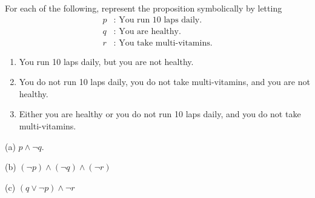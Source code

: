 \documentclass[a4paper,12pt]{article}
\begin{document}
\begin{problem}
	For each of the following, represent the proposition symbolically by letting
	\begin{align*}
	p &: \textrm{ You run 10 laps daily.} \\
	q &: \textrm{ You are healthy.} \\
	r &: \textrm{ You take multi-vitamins.}
	\end{align*}
	\begin{enumerate}[label= (\alph*)]
		\item You run 10 laps daily, but you are not healthy. 
		\item You do not run 10 laps daily, you do not take multi-vitamins, and you are not healthy. 
		\item Either you are healthy or you do not run 10 laps daily, and you do not take multi-vitamins. 
	\end{enumerate}
\end{problem}

\begin{solution}
	\vspace{2mm}
	
	(a) $p \wedge \neg q$. 
	
	(b) $(\neg p )\wedge (\neg q) \wedge (\neg r)$
	
	(c) $(q \vee \neg p) \wedge \neg r$
\end{solution}
\end{document}
